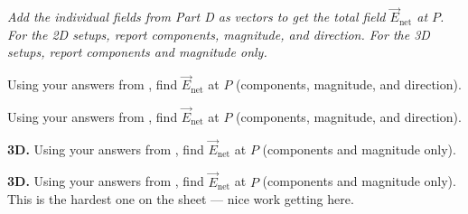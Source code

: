 \documentclass[12pt]{article}
\begin{document}
\textit{Add the individual fields from Part D as vectors to get the total field $\vec{E}_{\text{net}}$ at $P$. For the 2D setups, report components, magnitude, and direction. For the 3D setups, report components and magnitude only.}

\prob Using your answers from , find $\vec{E}_{\text{net}}$ at $P$ (components, magnitude, and direction).


\prob Using your answers from , find $\vec{E}_{\text{net}}$ at $P$ (components, magnitude, and direction).


\prob \textbf{3D.} Using your answers from , find $\vec{E}_{\text{net}}$ at $P$ (components and magnitude only).


\prob \textbf{3D.} Using your answers from , find $\vec{E}_{\text{net}}$ at $P$ (components and magnitude only). This is the hardest one on the sheet --- nice work getting here.

\end{document}
